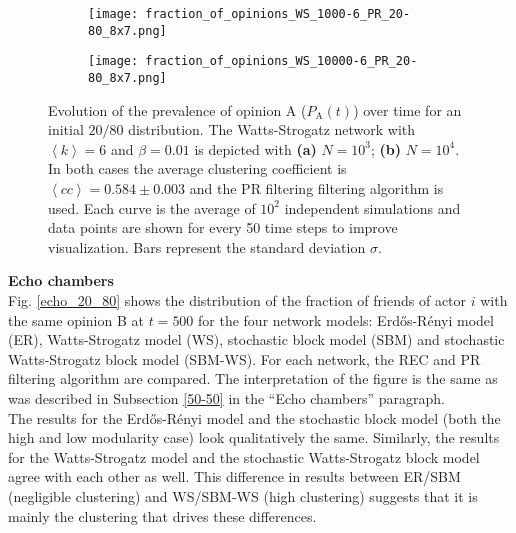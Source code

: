 \documentclass[11 pt , letterpaper , twoside , openright]{book}
\begin{document}
\begin{figure}[H]
  \begin{subfigure}[b]{0.49\textwidth}
    \caption{}
  	\texttt{[image: fraction\_of\_opinions\_WS\_1000-6\_PR\_20-80\_8x7.png]}
    \label{ws1000}
  \end{subfigure}
  \begin{subfigure}[b]{0.49\textwidth}
    \caption{}
  	\texttt{[image: fraction\_of\_opinions\_WS\_10000-6\_PR\_20-80\_8x7.png]}
    \label{ws10000}
  \end{subfigure}
  \captionsetup{format=plain}
  \caption[Evolution of the prevalence of opinion A ($P_\text{A}(t)$) over time for an initial $20/80$ opinion distribution for a WS model with $N=10^3$ or $N=10^4$, $\left<k\right>=6$ and $\beta = 0.01$. The PR filtering algorithm is used.]{Evolution of the prevalence of opinion A ($P_\text{A}(t)$) over time for an initial $20/80$ distribution. The Watts-Strogatz network with $\left<k\right> = 6$ and $\beta = 0.01$ is depicted with \textbf{(a)} $N=10^3$; \textbf{(b)} $N=10^4$. In both cases the average clustering coefficient is $\left<cc\right> = 0.584 \pm 0.003$ and the PR filtering filtering algorithm is used. Each curve is the average of $10^2$ independent simulations and data points are shown for every 50 time steps to improve visualization. Bars represent the standard deviation $\sigma$.}
\label{ev_op_WS_k=6}
\end{figure}
\noindent
\textbf{Echo chambers}\\
\newline
Fig. \ref{echo_20_80} shows the distribution of the fraction of friends of actor $i$ with the same opinion B at $t=500$ for the four network models: Erd\H{o}s-R\'{e}nyi model (ER), Watts-Strogatz model (WS), stochastic block model (SBM) and stochastic Watts-Strogatz block model (SBM-WS). For each network, the REC and PR filtering algorithm are compared. The interpretation of the figure is the same as was described in Subsection \ref{50-50} in the ``Echo chambers'' paragraph.\\
\newline
The results for the Erd\H{o}s-R\'{e}nyi model and the stochastic block model (both the high and low modularity case) look qualitatively the same. Similarly, the results for the Watts-Strogatz model and the stochastic Watts-Strogatz block model agree with each other as well. This difference in results between ER/SBM (negligible clustering) and WS/SBM-WS (high clustering) suggests that it is mainly the clustering that drives these differences.\\
\end{document}
